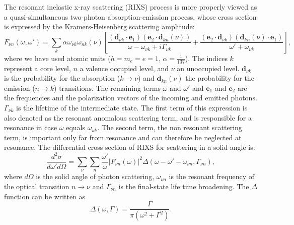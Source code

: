 \documentclass[a4paper,11pt,twoside,openright]{book}
\begin{document}
The resonant inelastic x-ray scattering (RIXS) process is more properly viewed as a quasi-simultaneous
two-photon absorption-emission process, whose cross section is expressed by the Kramers-Heisenberg
scattering amplitude\cite{Kramers-ZP31-681,Dirac-PRSLSA114-710}:
\begin{equation}
  \label{eq-rixs-cs}
  F_{\nu n}(\omega,\omega')
  =\sum_k\alpha\omega_{\nu k}\omega_{nk}(\nu)\left[
    \frac{(\mathbf{d}_{\nu k}\cdot\mathbf{e}_1)(\mathbf{e}_2\cdot\mathbf{d}_{kn}(\nu))}{\omega-\omega_{\nu k}+i\Gamma_{\nu k}}
    +\frac{(\mathbf{e}_2\cdot\mathbf{d}_{\nu k})(\mathbf{d}_{kn}(\nu)\cdot\mathbf{e}_1)}{\omega'+\omega_{\nu k}}\right],
\end{equation}
where we have used atomic units ($h=m_e=e=1$, $\alpha=\frac{1}{137}$). The indices $k$ represent a
core level, $n$ a valence occupied level, and $\nu$ an unoccupied level. $\mathbf{d}_{\nu k}$ is the
probability for the absorption ($k\rightarrow\nu$) and $\mathbf{d}_{kn}(\nu)$ the probability for the emission
($n\rightarrow k$) transitions. The remaining terms $\omega$ and $\omega'$ and $\mathbf{e}_1$ and
$\mathbf{e}_2$ are the frequencies and the polarization vectors of the incoming and emitted photons.
$\Gamma_{\nu k}$ is the lifetime of the intermediate state. The first term of this expression is also denoted
as the resonant anomalous scattering term, and is responsible for a resonance in case $\omega$ equals
$\omega_{\nu k}$. The second term, the non resonant scattering term, is important only far from resonance
and can therefore be neglected at resonance. The differential cross section of RIXS for scattering in a solid
angle is\cite{Luo-JPB27-4169,Luo-PRB52-14479,Gelmukhanov-PR312-87}:
\begin{equation}
  \label{eq-rixs-ddcs}
  \frac{d^2\sigma}{d\omega'd\Omega}
  =\sum_{\nu}\sum_{n}\frac{\omega'}{\omega}|F_{\nu n}(\omega)|^2%
    \Delta(\omega-\omega'-\omega_{\nu n},\Gamma_{\nu n}),
\end{equation}
where $d\Omega$ is the solid angle of photon scattering, $\omega_{\nu n}$ is the resonant frequency
of the optical transition $n\rightarrow\nu$ and $\Gamma_{\nu n}$ is the final-state life time broadening.
The $\Delta$ function can be written as
\begin{equation}
  \label{eq-rixs-life-broadening}
  \Delta(\omega,\Gamma)=\frac{\Gamma}{\pi(\omega^2+\Gamma^2)}.
\end{equation}
\end{document}
